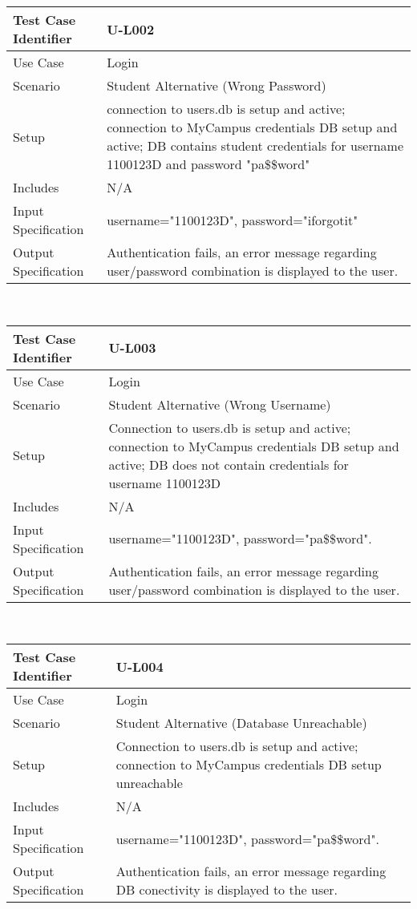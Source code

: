 \documentclass{l3deliverable}
\begin{document}
\begin{tabular}{lp{10cm}}
\hline 
\textbf{Test Case Identifier} & U-L002 \tabularnewline
\hline 
\hline 
Use Case & Login \tabularnewline
\hline 
Scenario & Student Alternative (Wrong Password) \tabularnewline
\hline 
Setup & connection to users.db is setup and active; connection to MyCampus credentials DB setup and active; DB contains student credentials for username 1100123D and password "pa\$\$word" \tabularnewline
\hline 
Includes & N/A \tabularnewline
\hline 
Input Specification & username="1100123D", password="iforgotit" \tabularnewline
\hline 
Output Specification & Authentication fails, an error message regarding user/password combination is displayed to the user.\tabularnewline
\hline 
\end{tabular}\\



\begin{tabular}{lp{10cm}}
\hline 
\textbf{Test Case Identifier} & U-L003\tabularnewline
\hline 
\hline 
Use Case & Login \tabularnewline
\hline 
Scenario & Student Alternative (Wrong Username) \tabularnewline
\hline 
Setup & Connection to users.db is setup and active; connection to MyCampus credentials DB setup and active; DB does not contain credentials for username 1100123D  \tabularnewline
\hline 
Includes & N/A \tabularnewline
\hline 
Input Specification & username="1100123D", password="pa\$\$word".\tabularnewline
\hline 
Output Specification & Authentication fails, an error message regarding user/password combination is displayed to the user.\tabularnewline
\hline 
\end{tabular}\\


\begin{tabular}{lp{10cm}}
\hline 
\textbf{Test Case Identifier} & U-L004\tabularnewline
\hline 
\hline 
Use Case & Login \tabularnewline
\hline 
Scenario & Student Alternative (Database Unreachable) \tabularnewline
\hline 
Setup & Connection to users.db is setup and active; connection to MyCampus credentials DB setup unreachable \tabularnewline
\hline 
Includes & N/A \tabularnewline
\hline 
Input Specification & username="1100123D", password="pa\$\$word".\tabularnewline
\hline 
Output Specification & Authentication fails, an error message regarding DB conectivity is displayed to the user.\tabularnewline
\hline 
\end{tabular}\\
\end{document}
